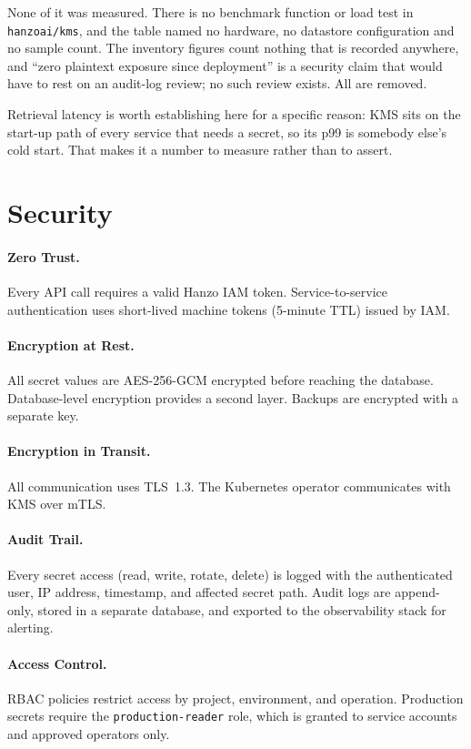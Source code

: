 \documentclass[11pt,twocolumn]{article}
\begin{document}
None of it was measured. There is no benchmark function or load test in
\texttt{hanzoai/kms}, and the table named no hardware, no datastore
configuration and no sample count. The inventory figures count nothing that is
recorded anywhere, and ``zero plaintext exposure since deployment'' is a
security claim that would have to rest on an audit-log review; no such review
exists. All are removed.

Retrieval latency is worth establishing here for a specific reason: KMS sits on
the start-up path of every service that needs a secret, so its p99 is somebody
else's cold start. That makes it a number to measure rather than to assert.

\section{Security}

\paragraph{Zero Trust.} Every API call requires a valid Hanzo IAM token. Service-to-service authentication uses short-lived machine tokens (5-minute TTL) issued by IAM.

\paragraph{Encryption at Rest.} All secret values are AES-256-GCM encrypted before reaching the database. Database-level encryption provides a second layer. Backups are encrypted with a separate key.

\paragraph{Encryption in Transit.} All communication uses TLS~1.3. The Kubernetes operator communicates with KMS over mTLS.

\paragraph{Audit Trail.} Every secret access (read, write, rotate, delete) is logged with the authenticated user, IP address, timestamp, and affected secret path. Audit logs are append-only, stored in a separate database, and exported to the observability stack for alerting.

\paragraph{Access Control.} RBAC policies restrict access by project, environment, and operation. Production secrets require the \texttt{production-reader} role, which is granted to service accounts and approved operators only.
\end{document}
